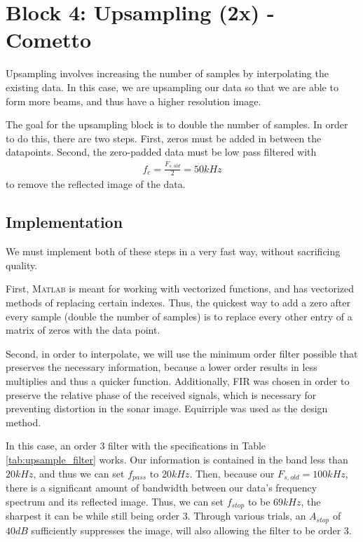 
\section{Block 4: Upsampling (2x) - Cometto}

Upsampling involves increasing the number of samples by interpolating the existing data.  In this case, we are upsampling our data so that we are able to form more beams, and thus have a higher resolution image.

The goal for the upsampling block is to double the number of samples.  In order to do this, there are two steps.  First, zeros must be added in between the datapoints.  Second, the zero-padded data must be low pass filtered with 
\begin{align*}
    f_c = \frac{F_{s,old}}{2} = 50 \unit{kHz}
\end{align*}
to remove the reflected image of the data.

\subsection{Implementation}

We must implement both of these steps in a very fast way, without sacrificing quality.

First, \textsc{Matlab} is meant for working with vectorized functions, and has vectorized methods of replacing certain indexes.  Thus, the quickest way to add a zero after every sample (double the number of samples) is to replace every other entry of a matrix of zeros with the data point.

Second, in order to interpolate, we will use the minimum order filter possible that preserves the necessary information, because a lower order results in less multiplies and thus a quicker function.  Additionally, FIR was chosen in order to preserve the relative phase of the received signals, which is necessary for preventing distortion in the sonar image.  Equirriple was used as the design method.

In this case, an order 3 filter with the specifications in Table \ref{tab:upsample_filter} works.  Our information is contained in the band less than $20 \unit{kHz}$, and thus we can set $f_{pass}$ to $20 \unit{kHz}$.  Then, because our $F_{s,old} = 100 \unit{kHz}$, there is a significant amount of bandwidth between our data's frequency spectrum and its reflected image.  Thus, we can set $f_{stop}$ to be $69 \unit{kHz}$, the sharpest it can be while still being order 3.  Through various trials, an $A_{stop}$ of $40 \unit{dB}$ sufficiently suppresses the image, will also allowing the filter to be order 3.

